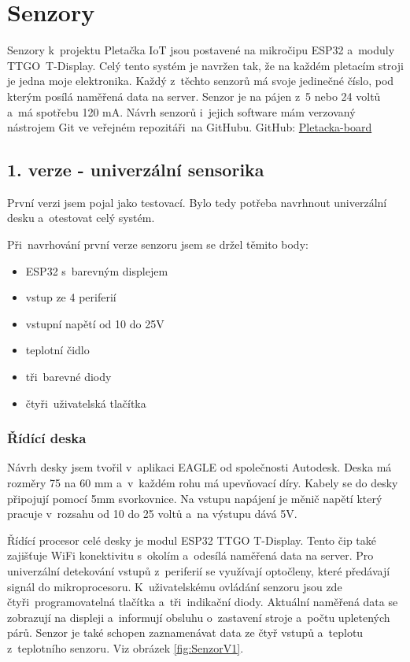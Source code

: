 \chapter{Senzory}

Senzory k~projektu Pletačka IoT jsou postavené na mikročipu ESP32 a~moduly TTGO~T-Display.
Celý tento systém je navržen tak, že na každém pletacím stroji je jedna moje elektronika.
Každý z~těchto senzorů má svoje jedinečné číslo, pod kterým posílá naměřená data na server.
Senzor je na pájen z~5 nebo 24 voltů a~má spotřebu 120 mA.
Návrh senzorů i~jejich software mám verzovaný nástrojem Git ve veřejném repozitáři~na GitHubu.\newline
GitHub: \href{https://github.com/Pletacka-IoT/Pletacka-board}{Pletacka-board}\cite{PL_BOARD}

\section{1. verze - univerzální sensorika}

První verzi jsem pojal jako testovací. Bylo tedy potřeba navrhnout univerzální desku a~otestovat celý systém.\newline

Při~navrhování první verze senzoru jsem se držel těmito body:
\begin{itemize}
    \item ESP32 s~barevným displejem
    \item vstup ze 4 periferií
    \item vstupní napětí od 10 do 25V
    \item teplotní čidlo
    \item tři~barevné diody
    \item čtyři~uživatelská tlačítka
\end{itemize}


\subsection{Řídící deska}
Návrh desky jsem tvořil v~aplikaci EAGLE od společnosti Autodesk. 
Deska má rozměry 75 na 60 mm a~v~každém rohu má upevňovací díry. 
Kabely se do desky připojují pomocí 5mm svorkovnice.
Na vstupu napájení je měnič napětí který pracuje v~rozsahu od 10 do 25 voltů a~na výstupu dává 5V. 

Řídící procesor celé desky je modul ESP32 TTGO T-Display.
Tento čip také zajišťuje WiFi konektivitu s~okolím a~odesílá naměřená data na server.
Pro univerzální detekování vstupů z~periferií se využívají optočleny, které předávají signál do mikroprocesoru.
K~uživatelskému ovládání senzoru jsou zde čtyři~programovatelná tlačítka a~tři~indikační diody.
Aktuální naměřená data se zobrazují na displeji a~informují obsluhu o~zastavení stroje a~počtu upletených párů.
Senzor je také schopen zaznamenávat data ze čtyř vstupů a~teplotu z~teplotního senzoru. Viz obrázek \ref{fig:SenzorV1}.

